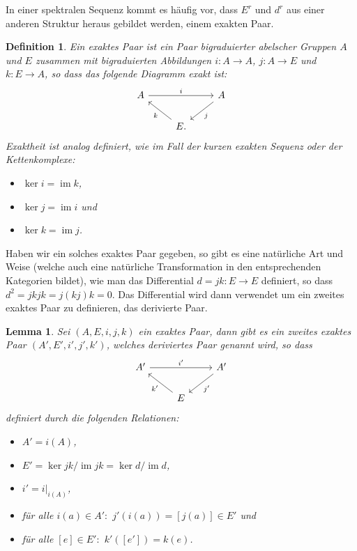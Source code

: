 \documentclass[12pt, hidelinks]{article}
\numberwithin{conj}{section}
\newtheorem{definition}[conj]{Definition}
\newtheorem{lemma}[conj]{Lemma}
\newcommand{\ima}{\operatorname{im}}
\begin{document}
In einer spektralen Sequenz kommt es häufig vor, dass $E^r$ und $d^r$ aus einer anderen Struktur heraus gebildet werden, einem exakten Paar.

\begin{definition}
    Ein exaktes Paar ist ein Paar bigraduierter abelscher Gruppen $A$ und $E$ zusammen mit bigraduierten Abbildungen $i: A \to A$, $j: A \to E$ und $k: E \to A$, so dass das folgende Diagramm exakt ist:
    \[\begin{tikzcd}
    	A && A \\
    	& E.
    	\arrow["i", from=1-1, to=1-3]
    	\arrow["j", from=1-3, to=2-2]
    	\arrow["k", from=2-2, to=1-1]
    \end{tikzcd}\]
    Exaktheit ist analog definiert, wie im Fall der kurzen exakten Sequenz oder der Kettenkomplexe:
    \begin{itemize}[nolistsep]
        \item $\ker i = \ima k$,
        \item $\ker j = \ima i$ und
        \item $\ker k = \ima j$.
    \end{itemize}
\end{definition}

Haben wir ein solches exaktes Paar gegeben, so gibt es eine natürliche Art und Weise (welche auch eine natürliche Transformation in den entsprechenden Kategorien bildet), wie man das Differential $d = jk: E \to E$ definiert, so dass $d^2 = jkjk = j(kj)k = 0$. Das Differential wird dann verwendet um ein zweites exaktes Paar zu definieren, das derivierte Paar.

\begin{lemma}
    Sei $(A,E,i,j,k)$ ein exaktes Paar, dann gibt es ein zweites exaktes Paar $(A',E',i',j',k')$, welches deriviertes Paar genannt wird, so dass
    \[\begin{tikzcd}
    	A' && A' \\
    	& E
    	\arrow["i'", from=1-1, to=1-3]
    	\arrow["j'", from=1-3, to=2-2]
    	\arrow["k'", from=2-2, to=1-1]
    \end{tikzcd}\]
    definiert durch die folgenden Relationen:
    \begin{itemize}[nolistsep]
        \item $A' = i(A)$,
        \item $E' = \ker jk / \ima jk = \ker d / \ima d$,
        \item $i' = i\vert_{i(A)}$,
        \item für alle $i(a) \in A':$ $j'(i(a)) = [j(a)] \in E'$ und
        \item für alle $[e] \in E':$ $k'([e']) = k(e)$.
    \end{itemize}
\end{lemma}
\end{document}
